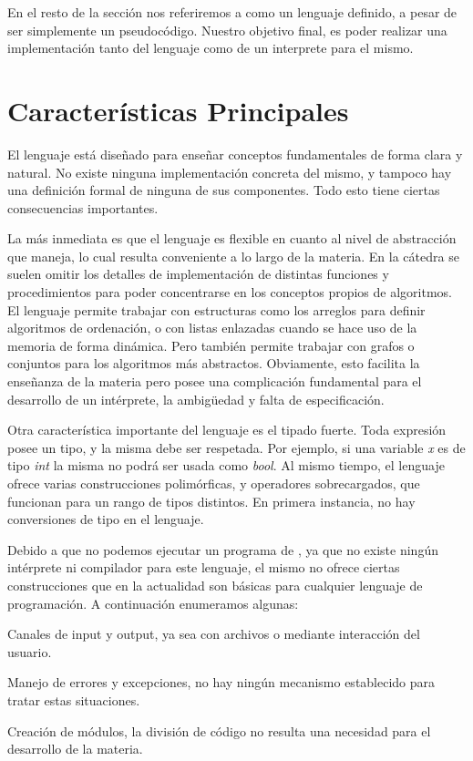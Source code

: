 \documentclass{article}
\begin{document}
En el resto de la sección nos referiremos a \Lang\space como un lenguaje definido, a pesar de ser simplemente un pseudocódigo.
Nuestro objetivo final, es poder realizar una implementación tanto del lenguaje como de un interprete para el mismo.

\section{Características Principales}

El lenguaje está diseñado para enseñar conceptos fundamentales de forma clara y natural.
No existe ninguna implementación concreta del mismo, y tampoco hay una definición formal de ninguna de sus componentes.
Todo esto tiene ciertas consecuencias importantes.

La más inmediata es que el lenguaje es flexible en cuanto al nivel de abstracción que maneja, lo cual resulta conveniente a lo largo de la materia.
En la cátedra se suelen omitir los detalles de implementación de distintas funciones y procedimientos para poder concentrarse en los conceptos propios de algoritmos.
El lenguaje permite trabajar con estructuras como los arreglos para definir algoritmos de ordenación, o con listas enlazadas cuando se hace uso de la memoria de forma dinámica.
Pero también permite trabajar con grafos o conjuntos para los algoritmos más abstractos.
Obviamente, esto facilita la enseñanza de la materia pero posee una complicación fundamental para el desarrollo de un intérprete, la ambigüedad y falta de especificación.

Otra característica importante del lenguaje es el tipado fuerte.
Toda expresión posee un tipo, y la misma debe ser respetada.
Por ejemplo, si una variable \textit{x} es de tipo \textit{int} la misma no podrá ser usada como \textit{bool}.
Al mismo tiempo, el lenguaje ofrece varias construcciones polimórficas, y operadores sobrecargados, que funcionan para un rango de tipos distintos.
En primera instancia, no hay conversiones de tipo en el lenguaje.

Debido a que no podemos ejecutar un programa de \Lang, ya que no existe ningún intérprete ni compilador para este lenguaje, el mismo no ofrece ciertas construcciones que en la actualidad son básicas para cualquier lenguaje de programación.
A continuación enumeramos algunas:
\begin{enumerate*}
\item Canales de input y output, ya sea con archivos o mediante interacción del usuario.
\item Manejo de errores y excepciones, no hay ningún mecanismo establecido para tratar estas situaciones.
\item Creación de módulos, la división de código no resulta una necesidad para el desarrollo de la materia.
\end{enumerate*}
\end{document}
